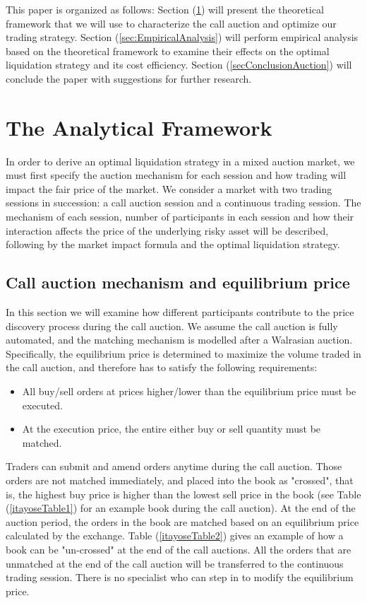 This paper is organized as follows: Section (\ref{sec:AnalyticalFramework}) will present the theoretical framework that we will use to characterize the call auction and optimize our trading strategy. Section (\ref{sec:EmpiricalAnalysis}) will perform empirical analysis based on the theoretical framework to examine their effects on the optimal liquidation strategy and its cost efficiency. Section (\ref{secConclusionAuction}) will conclude the paper with suggestions for further research.

\section{The Analytical Framework}\label{sec:AnalyticalFramework}

In order to derive an optimal liquidation strategy in a mixed auction market, we must first specify the auction mechanism for each session and how trading will impact the fair price of the market. We consider a market with two trading sessions in succession: a call auction session and a continuous trading session. The mechanism of each session, number of participants in each session and how their interaction affects the price of the underlying risky asset will be described, following by the market impact formula and the optimal liquidation strategy.

\subsection{Call auction mechanism and equilibrium price}\label{subsec:AnalyticalFrameworkCallAuction}

In this section we will examine how different participants contribute to the price discovery process during the call auction. We assume the call auction is fully automated, and the matching mechanism is modelled after a Walrasian auction. Specifically, the equilibrium price is determined to maximize the volume traded in the call auction, and therefore has to satisfy the following requirements:

\begin{itemize}
  \item All buy/sell orders at prices higher/lower than the equilibrium price must be executed.
  \item At the execution price, the entire either buy or sell quantity must be matched.
\end{itemize}

Traders can submit and amend orders anytime during the call auction. Those orders are not matched immediately, and placed into the book as "crossed", that is, the highest buy price is higher than the lowest sell price in the book (see Table (\ref{itayoseTable1}) for an example book during the call auction). At the end of the auction period, the orders in the book are matched based on an equilibrium price calculated by the exchange. Table (\ref{itayoseTable2}) gives an example of how a book can be "un-crossed" at the end of the call auctions. All the orders that are unmatched at the end of the call auction will be transferred to the continuous trading session. There is no specialist who can step in to modify the equilibrium price.


